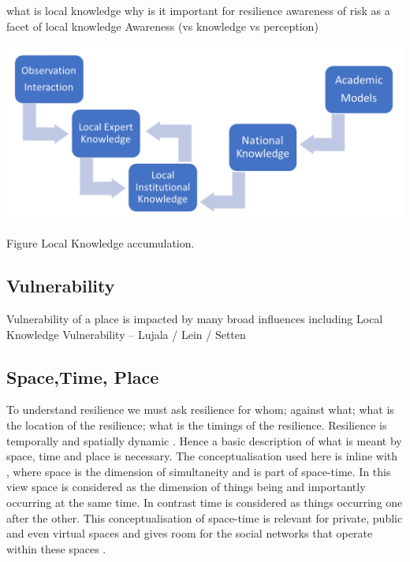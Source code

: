 \documentclass{article}
\begin{document}
what is local knowledge
why is it important for resilience
awareness of risk as a facet of local knowledge 
 Awareness (vs knowledge vs perception)

\includegraphics[width=1\textwidth]{fig_theory/local knowledge accumulation.png}

\begin{frame}{Figure Local Knowledge accumulation.}
\end{frame}
 
\subsection{Vulnerability}
Vulnerability of a place is impacted by many broad influences including Local Knowledge 
Vulnerability – Lujala / Lein / Setten 



\subsection{Space,Time, Place} 
To understand resilience we must ask resilience for whom; against what; what is the location of the resilience; what is the timings of the resilience. Resilience is temporally and spatially dynamic \cite{cutter_community_2020}. Hence a basic description of what is meant by space, time and place is necessary. The conceptualisation used here is inline with \cite{massey_for_2005}, where space is the dimension of simultaneity and is part of space-time. In this view space is considered as the dimension of things being and importantly occurring at the same time. In contrast time is considered as things occurring one after the other. This conceptualisation of space-time is relevant for private, public and even virtual spaces and gives room for the social networks that operate within these spaces \cite{massey_for_2005} \cite{allen_rethinking_1998}.
\end{document}
